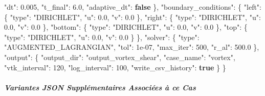 \documentclass[
  10pt,
]{article}
\newenvironment{Shaded}{}{}
\newcommand{\DataTypeTok}[1]{\textcolor[rgb]{0.56,0.13,0.00}{#1}}
\newcommand{\DecValTok}[1]{\textcolor[rgb]{0.25,0.63,0.44}{#1}}
\newcommand{\FloatTok}[1]{\textcolor[rgb]{0.25,0.63,0.44}{#1}}
\newcommand{\FunctionTok}[1]{\textcolor[rgb]{0.02,0.16,0.49}{#1}}
\newcommand{\KeywordTok}[1]{\textcolor[rgb]{0.00,0.44,0.13}{\textbf{#1}}}
\newcommand{\StringTok}[1]{\textcolor[rgb]{0.25,0.44,0.63}{#1}}
\begin{document}
\begin{Shaded}
\begin{Highlighting}[]
    \DataTypeTok{"dt"}\FunctionTok{:} \FloatTok{0.005}\FunctionTok{,}
    \DataTypeTok{"t\_final"}\FunctionTok{:} \FloatTok{6.0}\FunctionTok{,}
    \DataTypeTok{"adaptive\_dt"}\FunctionTok{:} \KeywordTok{false}
  \FunctionTok{\},}
  \DataTypeTok{"boundary\_conditions"}\FunctionTok{:} \FunctionTok{\{}
    \DataTypeTok{"left"}\FunctionTok{:} \FunctionTok{\{}
      \DataTypeTok{"type"}\FunctionTok{:} \StringTok{"DIRICHLET"}\FunctionTok{,}
      \DataTypeTok{"u"}\FunctionTok{:} \FloatTok{0.0}\FunctionTok{,}
      \DataTypeTok{"v"}\FunctionTok{:} \FloatTok{0.0}
    \FunctionTok{\},}
    \DataTypeTok{"right"}\FunctionTok{:} \FunctionTok{\{}
      \DataTypeTok{"type"}\FunctionTok{:} \StringTok{"DIRICHLET"}\FunctionTok{,}
      \DataTypeTok{"u"}\FunctionTok{:} \FloatTok{0.0}\FunctionTok{,}
      \DataTypeTok{"v"}\FunctionTok{:} \FloatTok{0.0}
    \FunctionTok{\},}
    \DataTypeTok{"bottom"}\FunctionTok{:} \FunctionTok{\{}
      \DataTypeTok{"type"}\FunctionTok{:} \StringTok{"DIRICHLET"}\FunctionTok{,}
      \DataTypeTok{"u"}\FunctionTok{:} \FloatTok{0.0}\FunctionTok{,}
      \DataTypeTok{"v"}\FunctionTok{:} \FloatTok{0.0}
    \FunctionTok{\},}
    \DataTypeTok{"top"}\FunctionTok{:} \FunctionTok{\{}
      \DataTypeTok{"type"}\FunctionTok{:} \StringTok{"DIRICHLET"}\FunctionTok{,}
      \DataTypeTok{"u"}\FunctionTok{:} \FloatTok{0.0}\FunctionTok{,}
      \DataTypeTok{"v"}\FunctionTok{:} \FloatTok{0.0}
    \FunctionTok{\}}
  \FunctionTok{\},}
  \DataTypeTok{"solver"}\FunctionTok{:} \FunctionTok{\{}
    \DataTypeTok{"type"}\FunctionTok{:} \StringTok{"AUGMENTED\_LAGRANGIAN"}\FunctionTok{,}
    \DataTypeTok{"tol"}\FunctionTok{:} \DecValTok{1e{-}07}\FunctionTok{,}
    \DataTypeTok{"max\_iter"}\FunctionTok{:} \DecValTok{500}\FunctionTok{,}
    \DataTypeTok{"r\_al"}\FunctionTok{:} \FloatTok{500.0}
  \FunctionTok{\},}
  \DataTypeTok{"output"}\FunctionTok{:} \FunctionTok{\{}
    \DataTypeTok{"output\_dir"}\FunctionTok{:} \StringTok{"output\_vortex\_shear"}\FunctionTok{,}
    \DataTypeTok{"case\_name"}\FunctionTok{:} \StringTok{"vortex"}\FunctionTok{,}
    \DataTypeTok{"vtk\_interval"}\FunctionTok{:} \DecValTok{120}\FunctionTok{,}
    \DataTypeTok{"log\_interval"}\FunctionTok{:} \DecValTok{100}\FunctionTok{,}
    \DataTypeTok{"write\_csv\_history"}\FunctionTok{:} \KeywordTok{true}
  \FunctionTok{\}}
\FunctionTok{\}}
\end{Highlighting}
\end{Shaded}

\subparagraph{Variantes JSON Supplémentaires Associées à ce
Cas}\label{variantes-json-suppluxe9mentaires-associuxe9es-uxe0-ce-cas}
\end{document}
